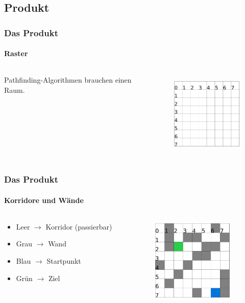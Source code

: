 \documentclass[professionalfont,serif,german]{beamer}
\begin{document}
\begin{frame}
  \section{Produkt}
  \frametitle{Das Produkt}
  \framesubtitle{Raster}
    \begin{columns}
      \begin{column}[T]{0.5\textwidth}
        Pathfinding-Algorithmen brauchen einen Raum.
      \end{column}
      \begin{column}[T]{0.5\textwidth}
        \begin{figure}
          \includegraphics[height=4cm]{img/grid1.png}
        \end{figure}
      \end{column}
    \end{columns}
\end{frame}

\begin{frame}
  \frametitle{Das Produkt}
  \framesubtitle{Korridore und Wände}
  \begin{columns}
    \begin{column}[T]{0.5\textwidth}
      \begin{itemize}
        \item Leer $\rightarrow$ Korridor (passierbar)
        \item Grau $\rightarrow$ Wand
        \item Blau $\rightarrow$ Startpunkt
        \item Grün $\rightarrow$ Ziel
      \end{itemize}
    \end{column}
    \begin{column}[T]{0.5\textwidth}
      \begin{figure}
        \includegraphics[height=4cm]{img/grid2.png}
      \end{figure}
    \end{column}
  \end{columns}
\end{frame}
\end{document}

